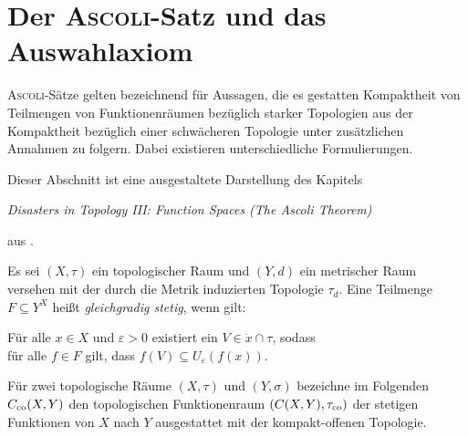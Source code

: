 \chapter{Der \textsc{Ascoli}-Satz und das Auswahlaxiom}

\textsc{Ascoli}-Sätze gelten bezeichnend für Aussagen, die es gestatten Kompaktheit von Teilmengen von Funktionenräumen bezüglich starker Topologien aus der Kompaktheit bezüglich einer schwächeren Topologie unter zusätzlichen Annahmen zu folgern. Dabei existieren unterschiedliche Formulierungen.

Dieser Abschnitt ist eine ausgestaltete Darstellung des Kapitels  
\begin{addmargin}[2em]{2em}%
  \textit{Disasters in Topology III: Function Spaces (The Ascoli Theorem)}
\end{addmargin}
aus \cite{herrlich2006axiom}. 


\begin{defn}
  Es sei $(X,\tau)$ ein topologischer Raum und $(Y,d)$ ein metrischer Raum versehen mit der durch die Metrik induzierten Topologie $\tau_d$. Eine Teilmenge $F \subseteq Y^X$ heißt \textit{gleichgradig stetig}, wenn gilt:
  \begin{addmargin}[2em]{2em}%
    Für alle $x \in X$ und $\varepsilon > 0$ existiert ein $V \in \dot{x} \cap \tau$, sodass \\
    für alle $f \in F$ gilt, dass $f(V) \subseteq U_\varepsilon(f(x))$.
  \end{addmargin}
\end{defn}

Für zwei topologische Räume $(X,\tau)$ und $(Y,\sigma)$ bezeichne im Folgenden $C_{\mathrm{co}}(X,Y)$ den topologischen Funktionenraum $(C(X,Y),\tau_{\mathrm{co}})$ der stetigen Funktionen von $X$ nach $Y$ ausgestattet mit der kompakt-offenen Topologie.

